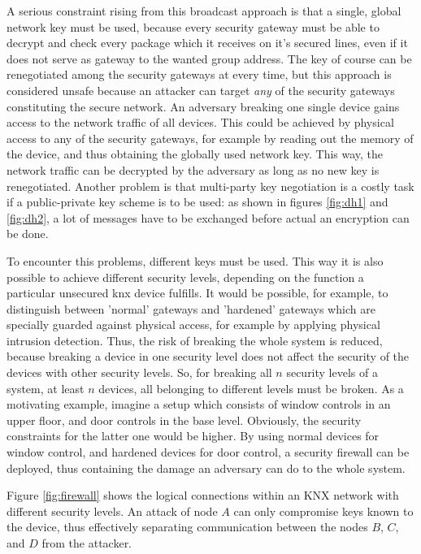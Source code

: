 A serious constraint rising from this broadcast approach is that a single,
global network key must be used, because every security gateway must be able to decrypt and check every package which it receives on it's secured lines,
even if it does not serve as gateway to the wanted group address. 
The key of course can be renegotiated among the security gateways at every time, but this approach is considered
unsafe because an attacker can target \textit{any} of the security gateways constituting the secure network. An adversary breaking one single device gains
access to the network traffic of all devices. This could be achieved by physical access to any of the security gateways, for example by reading out the
memory of the device, and thus obtaining the globally used network key. This way, the network traffic can be decrypted by the adversary as long as no new
key is renegotiated. Another problem is that multi-party key negotiation is a costly task if a public-private key scheme
is to be used: as shown in figures \ref{fig:dh1} and \ref{fig:dh2}, a lot of messages have to be exchanged before actual an encryption can be done. 

To encounter this problems, different keys must be used. This way it is also possible to achieve different security levels, depending on the function a 
particular unsecured knx device fulfills. It would be possible, for example, to distinguish between 'normal' gateways and 'hardened'
gateways which are specially guarded against physical access, for example by applying physical intrusion detection. Thus,
the risk of breaking the whole system is reduced, because breaking a device in one security level does not affect the security of the devices with other
security levels.
So, for breaking all $n$ security levels of a system, at least $n$ devices, all belonging to different levels must be broken.
As a motivating example, imagine a setup which consists of window controls in an upper floor, and door controls in the
base level. Obviously, the security constraints for the latter one would be higher. By using normal devices for window control, and hardened devices for
door control, a security firewall can be deployed, thus containing the damage an adversary can do to the whole system.

Figure \ref{fig:firewall} shows the logical connections within an KNX network with different security levels. An 
attack of node $A$ can only compromise keys known to the device, thus effectively separating communication between the nodes $B$, $C$, and $D$ from
the attacker. 

